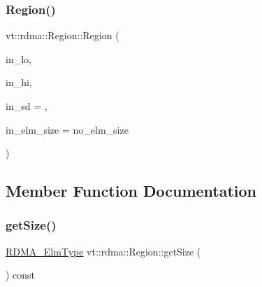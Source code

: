 \subsubsection{\texorpdfstring{Region()}{Region()}\hspace{0.1cm}{\footnotesize\ttfamily [2/2]}}
{\footnotesize\ttfamily vt\+::rdma\+::\+Region\+::\+Region (\begin{DoxyParamCaption}\item[{\hyperlink{namespacevt_a2c2a902092b72056f70210c159f966f0}{R\+D\+M\+A\+\_\+\+Elm\+Type} const \&}]{in\+\_\+lo,  }\item[{\hyperlink{namespacevt_a2c2a902092b72056f70210c159f966f0}{R\+D\+M\+A\+\_\+\+Elm\+Type} const \&}]{in\+\_\+hi,  }\item[{\hyperlink{namespacevt_a2c2a902092b72056f70210c159f966f0}{R\+D\+M\+A\+\_\+\+Elm\+Type} const \&}]{in\+\_\+sd = {},  }\item[{\hyperlink{namespacevt_1_1rdma_ac07ef96e399913495fde1da0f83f684c}{Region\+Elm\+Size\+Type} const \&}]{in\+\_\+elm\+\_\+size = {\ttfamily no\+\_\+elm\+\_\+size} }\end{DoxyParamCaption})\hspace{0.3cm}{\ttfamily [inline]}}



\subsection{Member Function Documentation}
\mbox{\label{structvt_1_1rdma_1_1_region_afbd46473558c9c4f4469023cbf7e6d80}} 
\subsubsection{\texorpdfstring{get\+Size()}{getSize()}}
{\footnotesize\ttfamily \hyperlink{namespacevt_a2c2a902092b72056f70210c159f966f0}{R\+D\+M\+A\+\_\+\+Elm\+Type} vt\+::rdma\+::\+Region\+::get\+Size (\begin{DoxyParamCaption}{ }\end{DoxyParamCaption}) const\hspace{0.3cm}{\ttfamily [inline]}}

\mbox{\label{structvt_1_1rdma_1_1_region_a5cc8077a08a31b1662feac8a1a6c257e}} 
